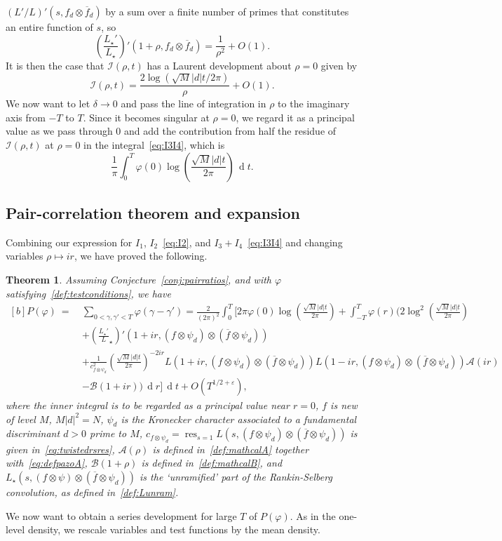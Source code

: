 \documentclass[11pt,reqno]{amsart} \usepackage{fullpage}
\newtheorem{theorem}[lemma]{Theorem}
\newcommand{\vep}{\varepsilon}
\newcommand{\ra}{\rightarrow}
\renewcommand{\d}[1]{\,\operatorname*{d}\!{#1}}
\newcommand\be{\begin{equation}}
\newcommand\ee{\end{equation}}
\DeclareMathOperator{\res}{res}
\newcommand{\Lunram}{L_{\star}}
\numberwithin{equation}{section}
\begin{document}
$(L'/L)'(s,f_d\otimes\overline f_d)$ by a sum over a finite number of primes that
constitutes an entire function of $s$, so
\be\left(\frac{\Lunram'}{\Lunram}\right)'(1+\rho,f_d\otimes\overline f_d)
=\frac1{\rho^2}+O(1).\ee
It is then the case that $\mathcal I(\rho,t)$ has a Laurent development
about $\rho=0$ given by
\be\mathcal I(\rho,t)=\frac{2\log\left(\sqrt M|d|t/2\pi\right)}{\rho}+O(1).\ee
We now want to let $\delta\ra0$ and pass the line of integration in $\rho$ to the imaginary
axis from $-T$ to $T$. Since it becomes singular at $\rho=0$, we regard it as a principal
value as we pass through 0 and add the contribution from half the residue of
$\mathcal I(\rho,t)$ at $\rho=0$ in the integral~\eqref{eq:I3I4}, which is
\be\frac1{\pi}\int_0^T\varphi(0)\log\left(\frac{\sqrt M|d|t}{2\pi}\right)\d t.\ee
\subsection{Pair-correlation theorem and expansion}\label{sec:pcthm}
Combining our expression for $I_1$, $I_2$~\eqref{eq:I2}, and $I_3+I_4$~\eqref{eq:I3I4} and
changing variables $\rho\mapsto ir$, we have proved the following.
\begin{theorem}
  Assuming Conjecture~\ref{conj:pairratios}, and with $\varphi$
  satisfying~\eqref{def:testconditions}, we have
  \be\begin{aligned}[b]P(\varphi)
    \ =\ &\sum_{0<\gamma,\gamma'<T}\varphi\left(\gamma-\gamma'\right)
    =\frac2{(2\pi)^2}\int_0^T\Bigg[
    2\pi\varphi(0)\log\left(\frac{\sqrt M|d|t}{2\pi}\right)
    +\int_{-T}^T\varphi(r)\Bigg(
    2\log^2\left(\frac{\sqrt M|d|t}{2\pi}\right) \\
    &+\left(\frac{\Lunram'}\Lunram\right)'
    \left(1+ir,(f\otimes\psi_d)\otimes(\overline f\otimes\psi_d)\right) \\
    &+\frac{1}{c_{f\otimes\psi_d}^2}
    \left(\frac{\sqrt M|d|t}{2\pi}\right)^{-2 ir}
    L(1+ir,(f\otimes\psi_d)\otimes(\overline f\otimes\psi_d))
    L(1-ir,(f\otimes\psi_d)\otimes(\overline f\otimes\psi_d))\mathcal A(ir) \\
    &-\mathcal B(1+ir)\Bigg)\d r\Bigg]\d t+O\left(T^{1/2+\vep}\right),
  \end{aligned}\ee
  where the inner integral is to be regarded as a principal value near $r=0$,
  $f$ is new of level $M$, $M|d|^2=N$, $\psi_d$ is the Kronecker character associated to
  a fundamental discriminant $d>0$ prime to $M$,
  $c_{f\otimes\psi_d}=\res_{s=1}L(s,(f\otimes\psi_d)\otimes(\overline f\otimes\psi_d))$
  is given in~\eqref{eq:twistedrsres},
  $\mathcal A(\rho)$ is defined in~\eqref{def:mathcalA} together with~\eqref{eq:defpazoA},
  $\mathcal B(1+\rho)$ is defined in~\eqref{def:mathcalB},
  and $\Lunram(s,(f\otimes\psi)\otimes(\overline f\otimes\psi_d))$ is the `unramified' part
  of the Rankin-Selberg convolution, as defined in~\eqref{def:Lunram}.
\end{theorem}
We now want to obtain a series development for large $T$ of $P(\varphi)$. As in the
one-level density, we rescale variables and test functions by the mean density.
\end{document}
